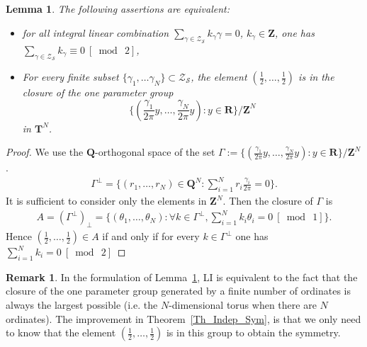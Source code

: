 \documentclass[a4paper,10pt]{amsart}
\theoremstyle{plain}
\newtheorem{lem}[theo]{Lemma}
\theoremstyle{definition}
\newtheorem{Rk}{Remark}
\begin{document}
\begin{lem}\label{Lem_Eq_sym}
	The following assertions are equivalent:
	\begin{itemize}
		\item for all integral linear combination  $\sum_{\gamma\in\mathcal{Z}_{\mathcal{S}}}k_{\gamma}\gamma = 0$, $k_{\gamma}\in\mathbf{Z}$, one has $\sum_{\gamma\in\mathcal{Z}_{\mathcal{S}}}k_{\gamma}\equiv 0\ [\bmod\ 2]$,
		\item For every finite subset $\lbrace \gamma_{1},\ldots\gamma_{N} \rbrace \subset \mathcal{Z}_{\mathcal{S}}$, the element $\left(\frac{1}{2},\ldots,\frac{1}{2}\right)$ is in the closure of the one parameter group 
		$$\lbrace (\frac{\gamma_{1}}{2\pi}y,\ldots,\frac{\gamma_{N}}{2\pi}y) : y\in \mathbf{R}\rbrace/\mathbf{Z}^{N}$$ in $\mathbf{T}^{N}$.
	\end{itemize}
\end{lem}
\begin{proof}
	We use the $\mathbf{Q}$-orthogonal space of the set 
	$\Gamma:=\lbrace (\frac{\gamma_{1}}{2\pi}y,\ldots,\frac{\gamma_{N}}{2\pi}y) : y\in \mathbf{R}\rbrace/\mathbf{Z}^{N}$.
	\begin{align*}
	\Gamma^{\bot}=\lbrace (r_{1},\ldots,r_{N})\in\mathbf{Q}^{N} : \sum_{i=1}^{N}r_{i}\frac{\gamma_{i}}{2\pi} =0\rbrace.
	\end{align*}
	It is sufficient to consider only the elements in $\mathbf{Z}^{N}$.
	Then the closure of $\Gamma$ is
	\begin{align*}
	A = (\Gamma^{\bot})_{\bot} = \lbrace (\theta_{1},\ldots,\theta_{N}) : \forall k\in \Gamma^{\bot}, 
	\sum_{i=1}^{N}k_{i}\theta_{i} =0\ [\bmod\ 1]  \rbrace.
	\end{align*}
	Hence $\left(\frac{1}{2},\ldots,\frac{1}{2}\right)\in A$ if and only if for every $k\in\Gamma^{\bot}$ one has $\sum_{i=1}^{N}k_{i} =0 \ [\bmod\ 2]$
\end{proof}

\begin{Rk}
In the formulation of Lemma~\ref{Lem_Eq_sym}, LI is equivalent to the fact that the closure of the one parameter group generated by a finite number of ordinates is always the largest possible (i.e. the $N$-dimensional torus when there are $N$ ordinates).
The improvement in Theorem~\ref{Th_Indep_Sym}, is that we only need to know that the element $\left(\frac{1}{2},\ldots,\frac{1}{2}\right)$ is in this group to obtain the symmetry.
\end{Rk}
\end{document}
